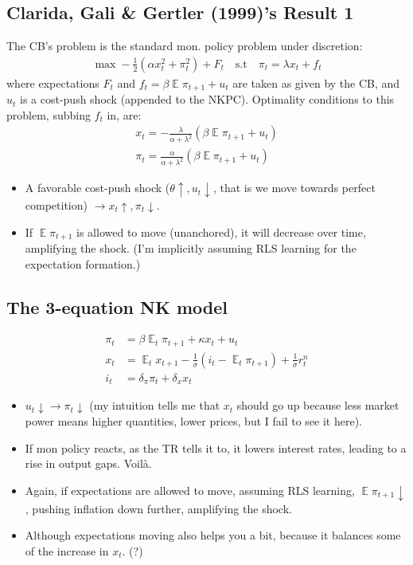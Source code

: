 \documentclass[11pt]{article}
\renewcommand{\[}{\begin{equation}}
\renewcommand{\]}{\end{equation}}
\DeclareMathOperator{\E}{\mathbb{E}}
\begin{document}
\subsection{Clarida, Gali \& Gertler (1999)'s Result 1}
The CB's problem is the standard mon. policy problem under discretion:
\begin{align}
\max -\frac{1}{2}(\alpha x_t^2 + \pi_t^2 ) + F_t \quad \text{s.t} \quad \pi_t = \lambda x_t + f_t
\end{align}
where expectations $F_t$ and $f_t = \beta \E \pi_{t+1} + u_t$ are taken as given by the CB, and $u_t$ is a cost-push shock (appended to the NKPC). Optimality conditions to this problem, subbing $f_t$ in, are:
\begin{align}
x_t = -\frac{\lambda}{\alpha + \lambda^2}(\beta \E \pi_{t+1} + u_t) \\
\pi_t = \frac{\alpha}{\alpha + \lambda^2}(\beta \E \pi_{t+1} + u_t) 
\end{align}
\begin{itemize}
\item A favorable cost-push shock ($\theta  \uparrow, u_t \downarrow$, that is we move towards perfect competition) $\rightarrow x_t \uparrow, \pi_t \downarrow$.
\item If $\E \pi_{t+1}$ is allowed to move (unanchored), it will decrease over time, amplifying the shock. (I'm implicitly assuming RLS learning for the expectation formation.)
\end{itemize}

\subsection{The 3-equation NK model}
\begin{align}
\pi_t & = \beta \E_t\pi_{t+1} + \kappa x_t  + u_t\\
x_t & = \E_t x_{t+1} -\frac{1}{\sigma} (i_t - \E_t\pi_{t+1}) + \frac{1}{\sigma}r_t^n \\
i_t & = \delta_{\pi} \pi_t + \delta_x x_t
\end{align}
\begin{itemize}
\item $u_t \downarrow \rightarrow \pi_t \downarrow$ (my intuition tells me that $x_t$ should go up because less market power means higher quantities, lower prices, but I fail to see it here).
\item If mon policy reacts, as the TR tells it to, it lowers interest rates, leading to a rise in output gaps. Voil\`a. 
\item Again, if expectations are allowed to move, assuming RLS learning, $\E\pi_{t+1} \downarrow$, pushing inflation down further, amplifying the shock. 
\item Although expectations moving also helps you a bit, because it balances some of the increase in $x_t$. (?)
\end{itemize}
\end{document}
